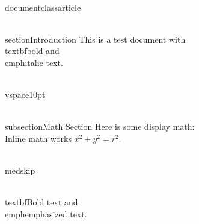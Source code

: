 \\documentclass{article}
\begin{document}
\\section{Introduction}
This is a test document with \\textbf{bold} and \\emph{italic} text.

\\vspace{10pt}

\\subsection{Math Section}
Here is some display math:
\\[
E = mc^2
\\]

Inline math works $x^2 + y^2 = r^2$.

\\medskip

\\textbf{Bold text} and \\emph{emphasized text}.

\
\end{document}
